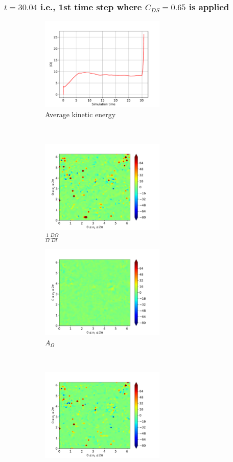 \subsubsection{$t=30.04$ i.e., 1st time step where $C_{DS}=0.65$ is applied} 
\begin{figure}[H]
    \begin{subfigure}[H]{0.45\textwidth}
        \includegraphics[height=1.75in]{media/run-cds-65/enst-average1400}
        \caption{Average kinetic energy}
    \end{subfigure}
    ~
    \begin{subfigure}[H]{0.45\textwidth}
        \includegraphics[height=1.75in]{media/run-cds-65/enst-1400}
        \caption{$\frac{1}{\Omega} \frac{D \Omega}{Dt}$}
    \end{subfigure}
    \newline
    \begin{subfigure}{0.45\textwidth}
        \includegraphics[height=1.75in]{media/run-cds-65/A-enst-1400}
        \caption{$A_{\Omega}$}
    \end{subfigure}
    ~
    \begin{subfigure}{0.45\textwidth}
        \includegraphics[height=1.75in]{media/run-cds-65/Pi-enst-1400}

\end{subfigure}
\end{figure}
